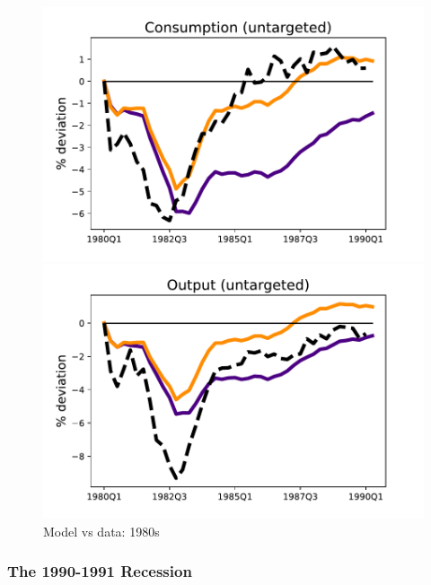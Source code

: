 \begin{figure}[H]
\medskip
\begin{minipage}{0.51\textwidth}
\includegraphics[scale=.57]{text/Chapter1/Figures/80s/PCE_IPR_80s}
\end{minipage}\hspace*{\fill}
\begin{minipage}{0.51\textwidth}
\includegraphics[scale=.57]{text/Chapter1/Figures/80s/GDP_IPR_80s}
\end{minipage}
\caption{Model vs data: 1980s}
\label{80s_recession}
\end{figure}





\subsubsection{The 1990-1991 Recession}

